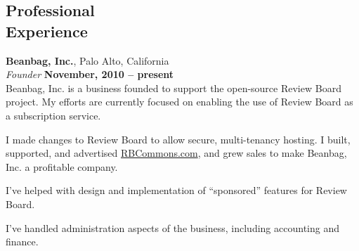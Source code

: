 \documentclass[margin,line]{resume}
\begin{document}
\begin{resume}
    \section{\mysidestyle Professional\\Experience}

    {\bf Beanbag, Inc.}, Palo Alto, California \vspace{2mm}\\\vspace{1mm}%
    {\sl Founder} \hfill {\bf November, 2010 -- present }\\
    Beanbag, Inc. is a business founded to support the open-source Review Board
    project. My efforts are currently focused on enabling the use of Review
    Board as a subscription service.
    \vspace{3mm}
    \begin{list1}
    \item I made changes to Review Board to allow secure, multi-tenancy hosting.
          I built, supported, and advertised \url{RBCommons.com}, and grew sales
          to make Beanbag, Inc. a profitable company.
    \item I've helped with design and implementation of ``sponsored'' features
          for Review Board.
    \item I've handled administration aspects of the business, including
          accounting and finance.
    \end{list1}


\end{resume}
\end{document}
